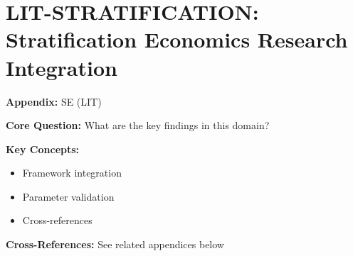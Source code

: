

\chapter{LIT-STRATIFICATION: Stratification Economics Research Integration}
\label{app:lit-stratification}


\begin{tcolorbox}[colback=blue!5!white, colframe=blue!75!black,
    title=Quick Reference: Appendix UNMAPPED_SE]

\textbf{Appendix:} SE (LIT)

\textbf{Core Question:} What are the key findings in this domain?

\textbf{Key Concepts:}
\begin{itemize}[nosep]
\item Framework integration
\item Parameter validation
\item Cross-references
\end{itemize}

\textbf{Cross-References:} See related appendices below
\end{tcolorbox}

